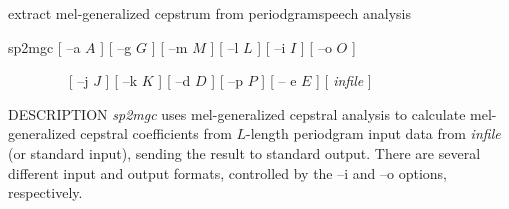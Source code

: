 % 
% 
% 
% 
%                                                                        
%
\hypertarget{sp2mgc}{}
%
{extract mel-generalized cepstrum from periodgram}{speech analysis}

\begin{synopsis}
\item[sp2mgc]   [ --a $A$ ] [ --g $G$ ] [ --m $M$ ] [ --l $L$ ] 
	       [ --i $I$ ] [ --o $O$ ]
\item[\ ~~~~~~~] [ --j $J$ ] [ --k $K$ ] [ --d $D$ ] [ --p $P$ ] [ -- e $E$ ] 
		 [ {\em infile} ]
\end{synopsis}

\begin{qsection}{DESCRIPTION}
{\em sp2mgc} uses mel-generalized cepstral analysis 
to calculate mel-generalized cepstral coefficients 
from $L$-length periodgram input data 
from {\em infile} (or standard input), 
sending the result to standard output. 
There are several different input and output formats,
controlled by the --i and --o options, respectively.
\end{qsection}


